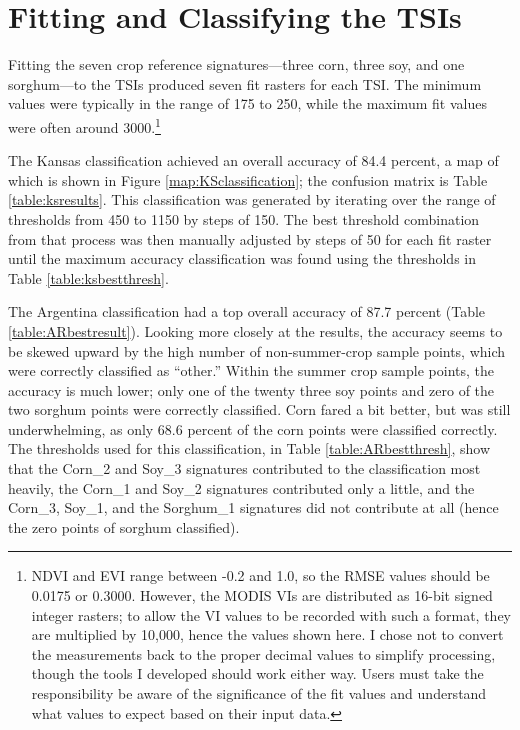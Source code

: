\section{Fitting and Classifying the TSIs}

Fitting the seven crop reference signatures---three corn, three soy, and one sorghum---to the TSIs produced seven fit rasters for each TSI. The minimum values were typically in the range of 175 to 250, while the maximum fit values were often around 3000.\footnote{NDVI and EVI range between -0.2 and 1.0, so the RMSE values should be 0.0175 or 0.3000. However, the MODIS VIs are distributed as 16-bit signed integer rasters; to allow the VI values to be recorded with such a format, they are multiplied by 10,000, hence the values shown here. I chose not to convert the measurements back to the proper decimal values to simplify processing, though the tools I developed should work either way.  Users must take the responsibility be aware of the significance of the fit values and understand what values to expect based on their input data.} 

The Kansas classification achieved an overall accuracy of 84.4 percent, a map of which is shown in Figure \ref{map:KSclassification}; the confusion matrix is Table \ref{table:ksresults}. This classification was generated by iterating over the range of thresholds from 450 to 1150 by steps of 150. The best threshold combination from that process was then manually adjusted by steps of 50 for each fit raster until the maximum accuracy classification was found using the thresholds in Table \ref{table:ksbestthresh}.

The Argentina classification had a top overall accuracy of 87.7 percent (Table \ref{table:ARbestresult}). Looking more closely at the results, the accuracy seems to be skewed upward by the high number of non-summer-crop sample points, which were correctly classified as ``other.'' Within the summer crop sample points, the accuracy is much lower; only one of the twenty three soy points and zero of the two sorghum points were correctly classified. Corn fared a bit better, but was still underwhelming, as only 68.6 percent of the corn points were classified correctly. The thresholds used for this classification, in Table \ref{table:ARbestthresh}, show that the Corn\_2 and Soy\_3 signatures contributed to the classification most heavily, the Corn\_1 and Soy\_2 signatures contributed only a little, and the Corn\_3, Soy\_1, and the Sorghum\_1 signatures did not contribute at all (hence the zero points of sorghum classified).

